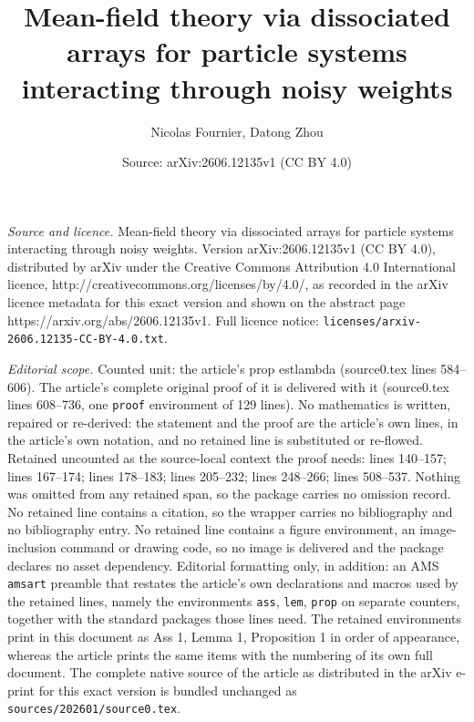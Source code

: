 \documentclass[10pt,a4paper]{amsart}
\title{Mean-field theory via dissociated arrays for particle systems interacting through noisy weights}
\author{Nicolas Fournier, Datong Zhou}
\date{Source: arXiv:2606.12135v1 (CC BY 4.0)}
\begin{document}
\maketitle

\noindent\emph{Source and licence.} Mean-field theory via dissociated arrays for particle systems interacting through noisy weights. Version arXiv:2606.12135v1 (CC BY 4.0), distributed by arXiv under the Creative Commons Attribution 4.0 International licence, http://creativecommons.org/licenses/by/4.0/, as recorded in the arXiv licence metadata for this exact version and shown on the abstract page https://arxiv.org/abs/2606.12135v1. Full licence notice: \texttt{licenses/arxiv-2606.12135-CC-BY-4.0.txt}.\par\smallskip

\noindent\textit{Editorial scope.} Counted unit: the article's prop estlambda (source0.tex lines 584--606). The article's complete original proof of it is delivered with it (source0.tex lines 608--736, one \texttt{proof} environment of 129 lines). No mathematics is written, repaired or re-derived: the statement and the proof are the article's own lines, in the article's own notation, and no retained line is substituted or re-flowed.  Retained uncounted as the source-local context the proof needs: lines 140--157; lines 167--174; lines 178--183; lines 205--232; lines 248--266; lines 508--537.  Nothing was omitted from any retained span, so the package carries no omission record.  No retained line contains a citation, so the wrapper carries no bibliography and no bibliography entry.  No retained line contains a figure environment, an image-inclusion command or drawing code, so no image is delivered and the package declares no asset dependency.  Editorial formatting only, in addition: an AMS \texttt{amsart} preamble that restates the article's own declarations and macros used by the retained lines, namely the environments \texttt{ass}, \texttt{lem}, \texttt{prop} on separate counters, together with the standard packages those lines need.  The retained environments print in this document as Ass 1, Lemma 1, Proposition 1 in order of appearance, whereas the article prints the same items with the numbering of its own full document.  The complete native source of the article as distributed in the arXiv e-print for this exact version is bundled unchanged as \texttt{sources/202601/source0.tex}.
\end{document}
